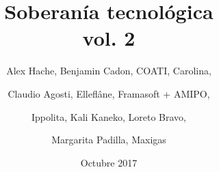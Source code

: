 \title{Soberanía tecnológica\\ vol. 2}
\author{
	Alex Hache, Benjamin Cadon, COATI, Carolina, \and 
	Claudio Agosti, Elleflâne, Framasoft + AMIPO, \and
	Ippolita, Kali Kaneko, Loreto Bravo,\and
	Margarita Padilla, Maxigas } 
\date{Octubre 2017}

